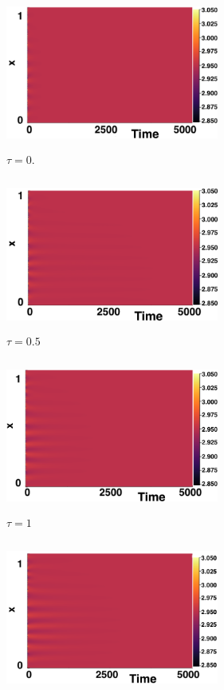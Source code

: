 \documentclass[12pt]{report}
\begin{document}
\begin{figure}[h]
    \centering
    \begin{subfigure}[b]{0.45\textwidth}
        \centering
        \includegraphics[width=7cm,height=5cm]{p3t0.png}
        \caption{$\tau=0$.}
        \label{}
    \end{subfigure}
    \hfill
    \begin{subfigure}[b]{0.45\textwidth}
        \centering
        \includegraphics[width=7cm,height=5cm]{p3t05.png}
        \caption{$\tau=0.5$}
        \label{}
    \end{subfigure}
    \hfill
    \begin{subfigure}[b]{0.45\textwidth}
        \centering
        \includegraphics[width=7cm,height=5cm]{p3t1.png}
        \caption{$\tau=1$}
        \label{}
    \end{subfigure}
    \hfill
    \begin{subfigure}[b]{0.45\textwidth}
        \centering
        \includegraphics[width=7cm,height=5cm]{p3t15.png}

\end{subfigure}
\end{figure}
\end{document}
